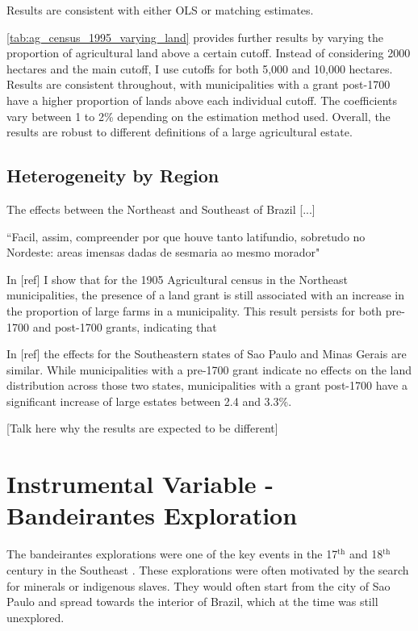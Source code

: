 \documentclass{article}
\begin{document}
Results are consistent with either OLS or matching estimates. 

\autoref{tab:ag_census_1995_varying_land} provides further results by varying the proportion of agricultural land above a certain cutoff. 
Instead of considering 2000 hectares and the main cutoff, I use cutoffs for both 5,000 and 10,000 hectares. 
Results are consistent throughout, with municipalities with a grant post-1700 have a higher proportion of lands above each individual cutoff. 
The coefficients vary between 1 to 2\% depending on the estimation method used. 
Overall, the results are robust to different definitions of a large agricultural estate.

\subsection{Heterogeneity by Region}

The effects between the Northeast and Southeast of Brazil [...]

``Facil, assim, compreender por que houve tanto latifundio, sobretudo no Nordeste: areas imensas dadas de sesmaria ao mesmo morador" \parencite[p.~53]{Da_Costa_Porto1979-dz}

In [ref] I show that for the 1905 Agricultural census in the Northeast municipalities, the presence of a land grant is still associated with an increase in the proportion of large farms in a municipality. 
This result persists for both pre-1700 and post-1700 grants, indicating that 

In [ref] the effects for the Southeastern states of Sao Paulo and Minas Gerais are similar. 
While municipalities with a pre-1700 grant indicate no effects on the land distribution across those two states, municipalities with a grant post-1700 have a significant increase of large estates between 2.4 and 3.3\%. 

[Talk here why the results are expected to be different]


\parencite{Mueller1995-gi}

\section{Instrumental Variable - Bandeirantes Exploration}

The bandeirantes explorations were one of the key events in the 17$^{\text{th}}$ and 18$^\text{th}$ century in the Southeast \parencite[p.~46-47]{Fausto2014-bh}. 
These explorations were often motivated by the search for minerals or indigenous slaves. 
They would often start from the city of Sao Paulo and spread towards the interior of Brazil, which at the time was still unexplored. 
\end{document}
